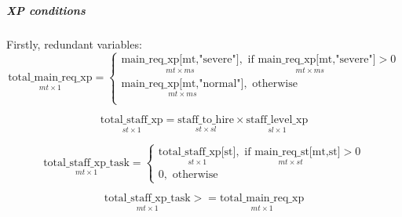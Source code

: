         \subparagraph{XP conditions} \label{xp condition} \text{} \newline
        \hspace*{.5cm}Firstly, redundant variables:
        \begin{equation}
            \underset{mt\times 1}{\mathrm{\text{total\_main\_req\_xp}}} = 
            \begin{cases}
                \underset{mt\times ms}{\text{main\_req\_xp[mt,"severe"]}}, \underset{mt\times ms}{\text{ if } \text{main\_req\_xp[mt,"severe"]}} > 0\\[3ex]
                \underset{mt\times ms}{\text{main\_req\_xp[mt,"normal"]}}, \text{ otherwise}\\
            \end{cases}
        \end{equation}

        \begin{equation}
            \underset{st\times 1}{\text{total\_staff\_xp}} =  
                \underset{st\times sl}{\text{staff\_to\_hire}}\times \underset{sl\times 1}{\text{staff\_level\_xp}}
        \end{equation}

        \begin{equation}
            \underset{mt\times 1}{\text{total\_staff\_xp\_task}} =
            \begin{cases}
                \underset{st\times 1}{\text{total\_staff\_xp[st]}}, \underset{mt\times st}{\text{ if } \text{main\_req\_st[mt,st]}} > 0\\[3ex]
                0, \text{ otherwise}
            \end{cases}
        \end{equation} \newline

        \begin{equation} \label{xpeq}
            \underset{mt\times 1}{\text{total\_staff\_xp\_task}} >=  
                \underset{mt\times 1}{\text{total\_main\_req\_xp}}
        \end{equation}

